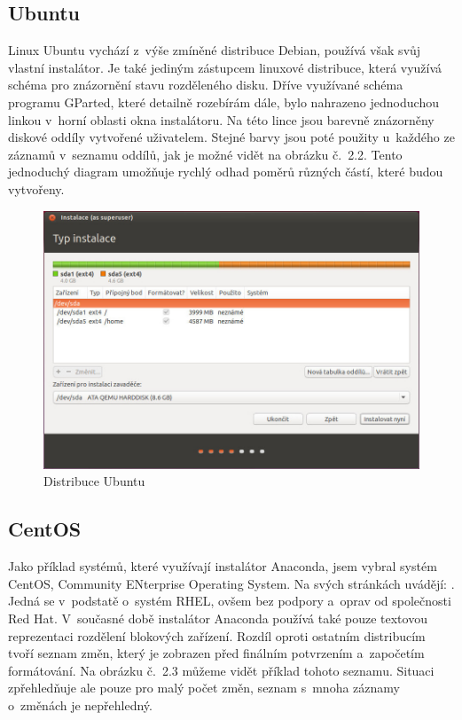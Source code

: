 \documentclass[color,table,oneside,nolot,nolof]{fithesis}
\begin{document}
\subsection{Ubuntu}

	Linux Ubuntu\cite{ubuntu} vychází z~výše zmíněné distribuce Debian, používá však svůj vlastní instalátor. Je také jediným zástupcem linuxové distribuce, která využívá  schéma 
	pro znázornění stavu rozděleného disku. Dříve využívané schéma programu GParted, které detailně rozebírám dále, bylo nahrazeno jednoduchou linkou v~horní oblasti okna instalátoru. Na této lince 
	jsou barevně znázorněny diskové 
	oddíly vytvořené uživatelem. Stejné barvy jsou poté použity u~každého ze záznamů v~seznamu oddílů, jak je možné vidět na obrázku č.~2.2. Tento jednoduchý diagram umožňuje rychlý odhad poměrů různých 
	částí, které budou vytvořeny.

\begin{figure}[h!]
	\label{fig:ubuntu}
	\caption{Distribuce Ubuntu}
	\centering
	\includegraphics[width=.8\columnwidth]{pictures/ubuntu1.jpg}
\end{figure}

\subsection{CentOS}

	Jako příklad systémů, které využívají instalátor Anaconda, jsem vybral systém CentOS, Community ENterprise Operating System. Na svých stránkách uvádějí: \cite{centos}. Jedná se v~podstatě o~systém 
	RHEL, ovšem bez podpory a~oprav od společnosti Red Hat. V~současné době instalátor Anaconda používá také pouze textovou reprezentaci rozdělení blokových zařízení. 
	Rozdíl oproti ostatním distribucím tvoří 
	seznam změn, který je zobrazen před finálním potvrzením a~započetím formátování. Na obrázku č.~2.3 můžeme vidět příklad tohoto seznamu. Situaci zpřehledňuje ale pouze pro malý počet změn, seznam s~mnoha 
	záznamy o~změnách je nepřehledný. 
\end{document}
